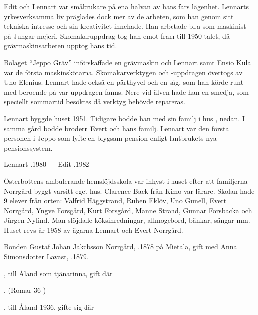 Edit och Lennart var småbrukare på ena halvan av hans fars lägenhet. Lennarts yrkesverksamma liv präglades dock mer av de arbeten, som han genom sitt tekniska intresse och sin kreativitet innehade. Han arbetade bl.a som maskinist på Jungar mejeri. Skomakaruppdrag tog han emot fram till 1950-talet, då grävmaskinsarbeten upptog hans tid.

Bolaget ``Jeppo Gräv'' införskaffade en grävmaskin och Lennart samt Ensio Kula var de första maskinskötarna. Skomakarverktygen och -uppdragen övertogs av Uno Elenius. Lennart hade också en pärthyvel och en såg, som han körde runt med beroende på var uppdragen fanns. Nere vid älven hade han en smedja, som speciellt sommartid besöktes då verktyg behövde repareras.

Lennart byggde huset 1951. Tidigare bodde han med sin familj i hus , nedan. I samma gård bodde brodern Evert och hans familj. Lennart var den första personen i Jeppo som lyfte en blygsam pension enligt lantbrukets nya pensionssystem.

Lennart .1980  ---  Edit .1982



%


%
Österbottens ambulerande hemslöjdsskola var inhyst i huset efter att familjerna Norrgård byggt varsitt eget hus. Clarence Back från Kimo var lärare. Skolan hade 9 elever från orten: Valfrid Häggstrand, Ruben Eklöv, Uno Gunell, Evert Norrgård, Yngve Forsgård, Kurt Forsgård, Manne Strand, Gunnar Forsbacka och Jürgen Nylind. Man slöjdade köksinredningar, allmogebord, bänkar, sängar mm. Huset revs år 1958 av ägarna Lennart och Evert Norrgård.



%
Bonden Gustaf Johan Jakobsson Norrgård, .1878 på Mietala, gift med Anna Simonsdotter Lavast, .1879.
\begin{jhchildren}
  \item {}, till Åland som tjänarinna, gift där
  \item {}
  \item {}
  \item {}
  \item {}, (Romar 36 )
  \item {}, till Åland 1936, gifte sig där
\end{jhchildren}

